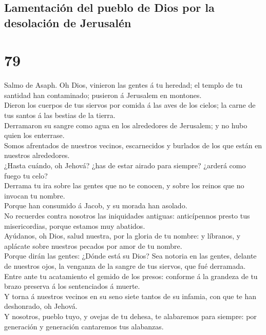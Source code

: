 \hypertarget{lamentaciuxf3n-del-pueblo-de-dios-por-la-desolaciuxf3n-de-jerusaluxe9n}{%
\subsection{Lamentación del pueblo de Dios por la desolación de
Jerusalén}\label{lamentaciuxf3n-del-pueblo-de-dios-por-la-desolaciuxf3n-de-jerusaluxe9n}}

\hypertarget{section-19-79}{%
\section{79}\label{section-19-79}}

 Salmo de Asaph. Oh Dios, vinieron las gentes á tu
heredad; el templo de tu santidad han contaminado; pusieron á Jerusalem
en montones.\\
 Dieron los cuerpos de tus siervos por comida á las aves
de los cielos; la carne de tus santos á las bestias de la tierra.\\
 Derramaron su sangre como agua en los alrededores de
Jerusalem; y no hubo quien los enterrase.\\
 Somos afrentados de nuestros vecinos, escarnecidos y
burlados de los que están en nuestros alrededores.\\
 ¿Hasta cuándo, oh Jehová? ¿has de estar airado para
siempre? ¿arderá como fuego tu celo?\\
 Derrama tu ira sobre las gentes que no te conocen, y
sobre los reinos que no invocan tu nombre.\\
 Porque han consumido á Jacob, y su morada han asolado.\\
 No recuerdes contra nosotros las iniquidades antiguas:
anticípennos presto tus misericordias, porque estamos muy abatidos.\\
 Ayúdanos, oh Dios, salud nuestra, por la gloria de tu
nombre: y líbranos, y aplácate sobre nuestros pecados por amor de tu
nombre.\\
 Porque dirán las gentes: ¿Dónde está su Dios? Sea
notoria en las gentes, delante de nuestros ojos, la venganza de la
sangre de tus siervos, que fué derramada.\\
 Entre ante tu acatamiento el gemido de los presos:
conforme á la grandeza de tu brazo preserva á los sentenciados á
muerte.\\
 Y torna á nuestros vecinos en su seno siete tantos de su
infamia, con que te han deshonrado, oh Jehová.\\
 Y nosotros, pueblo tuyo, y ovejas de tu dehesa, te
alabaremos para siempre: por generación y generación cantaremos tus
alabanzas.

